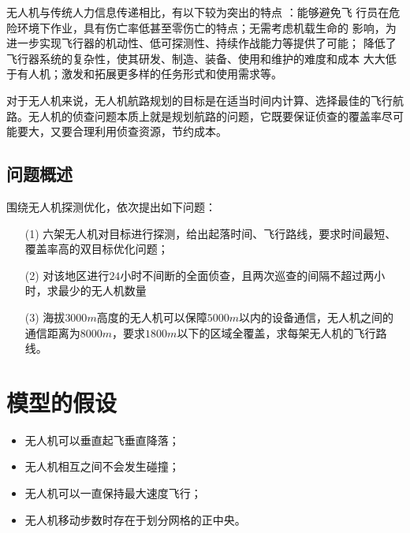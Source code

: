 \documentclass{whutmod}
\begin{document}
	无人机与传统人力信息传递相比，有以下较为突出的特点 ：能够避免飞
	行员在危险环境下作业，具有伤亡率低甚至零伤亡的特点；无需考虑机载生命的
	影响，为进一步实现飞行器的机动性、低可探测性、持续作战能力等提供了可能；
	降低了飞行器系统的复杂性，使其研发、制造、装备、使用和维护的难度和成本
	大大低于有人机；激发和拓展更多样的任务形式和使用需求等\parencite{pasko2016unmanned}。
	
	对于无人机来说，无人机航路规划的目标是在适当时间内计算、选择最佳的飞行航路。无人机的侦查问题本质上就是规划航路的问题，它既要保证侦查的覆盖率尽可能要大，又要合理利用侦查资源，节约成本。

	
	\subsection{问题概述}
	
	围绕无人机探测优化，依次提出如下问题：
	
	\begin{itemize}
		\item [(1)]
		 六架无人机对目标进行探测，给出起落时间、飞行路线，要求时间最短、覆盖率高的双目标优化问题；
		\item [(2)] 
		对该地区进行$24$小时不间断的全面侦查，且两次巡查的间隔不超过两小时，求最少的无人机数量
		\item [(3)] 海拔$3000m$高度的无人机可以保障$5000m$以内的设备通信，无人机之间的通信距离为$8000m$，要求$1800m$以下的区域全覆盖，求每架无人机的飞行路线。
	\end{itemize}
	
	\section{模型的假设}
	\begin{itemize}
		\item 无人机可以垂直起飞垂直降落；
		\item 无人机相互之间不会发生碰撞；
		\item 无人机可以一直保持最大速度飞行；
		\item 无人机移动步数时存在于划分网格的正中央。
	\end{itemize}
	
	
\end{document}
